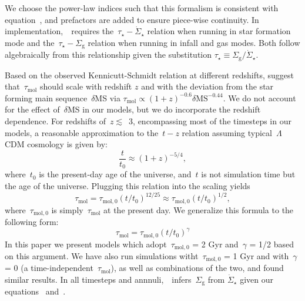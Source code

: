 \documentclass[draft2.tex]{subfiles}
\begin{document}
We choose the power-law indices such that this formalism is consistent 
with equation~, and prefactors are added to ensure 
piece-wise continuity. 
In implementation,~\vice~requires the~$\tau_\star-\dot{\Sigma}_\star$ relation 
when running in star formation mode and the~$\tau_\star-\Sigma_\text{g}$ 
relation when running in infall and gas modes. 
Both follow algebraically from this relationship given the substitution 
$\tau_\star \equiv \Sigma_\text{g} / \dot{\Sigma}_\star$. 
\par 
Based on the observed Kennicutt-Schmidt relation at different redshifts, 
\citet{Tacconi2018} suggest that~$\tau_\text{mol}$ should scale with redshift 
$z$ and with the deviation from the star forming main sequence~$\delta$MS via 
$\tau_\text{mol} \propto (1 + z)^{-0.6}\delta\text{MS}^{-0.44}$. 
We do not account for the effect of~$\delta$MS in our models, but we do 
incorporate the redshift dependence. 
For redshifts of~$z \lesssim$~3, encompassing most of the timesteps in 
our models, a reasonable approximation to the~$t - z$ relation assuming 
typical~$\Lambda$CDM cosmology is given by: 
\begin{equation} 
\frac{t}{t_0} \approx (1 + z)^{-5/4}, 
\end{equation} 
where~$t_0$ is the present-day age of the universe, and~$t$ is not simulation 
time but the age of the universe. Plugging this relation into the 
\citet{Tacconi2018} scaling yields 
\begin{equation} 
\tau_\text{mol} = \tau_{\text{mol},0}(t/t_0)^{12/25} \approx 
\tau_{\text{mol},0}(t/t_0)^{1/2}, 
\end{equation} 
where~$\tau_{\text{mol},0}$ is simply~$\tau_\text{mol}$ at the present day. We 
generalize this formula to the following form: 
\begin{equation} 
\tau_\text{mol} = \tau_{\text{mol},0}(t/t_0)^\gamma 
\label{eq:tau_mol}
\end{equation} 
In this paper we present models which adopt~$\tau_{\text{mol},0}$ = 2 Gyr 
\citep{Leroy2008, Leroy2013, Tacconi2018} and~$\gamma$ = 1/2 based on this 
argument. 
We have also run simulations witht~$\tau_{\text{mol},0}$ = 1 
Gyr and with~$\gamma$ = 0 (a time-independent~$\tau_\text{mol}$), as well as 
combinations of the two, and found similar results. 
In all timesteps and annnuli,~\vice~infers~$\Sigma_\text{g}$ from 
$\dot{\Sigma}_\star$ given our equations~ and~. 
\end{document}
